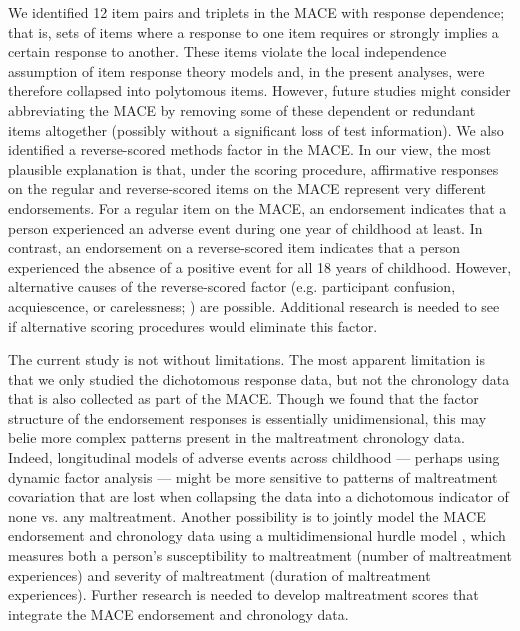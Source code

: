 \documentclass[letterpaper,man,natbib,noextraspace,floatsintext,longtable,12pt]{apa6}
\begin{document}
We identified 12 item pairs and triplets in the MACE with response dependence; that is, sets of items where a response to one item requires or strongly implies a certain response to another. These items violate the local independence assumption of item response theory models and, in the present analyses, were therefore collapsed into polytomous items. However, future studies might consider abbreviating the MACE by removing some of these dependent or redundant items altogether (possibly without a significant loss of test information). We also identified a reverse-scored methods factor in the MACE. In our view, the most plausible explanation is that, under the \cite{teicher2015maltreatment} scoring procedure, affirmative responses on the regular and reverse-scored items on the MACE represent very different endorsements. For a regular item on the MACE, an endorsement indicates that a person experienced an adverse event during one year of childhood at least. In contrast, an endorsement on a reverse-scored item indicates that a person experienced the absence of a positive event for all 18 years of childhood. However, alternative causes of the reverse-scored factor (e.g. participant confusion, acquiescence, or carelessness; \citealt{weijters2013reversed}) are possible. Additional research is needed to see if alternative scoring procedures would eliminate this factor. 

The current study is not without limitations. The most apparent limitation is that we only studied the dichotomous response data, but not the chronology data that is also collected as part of the MACE. Though we found that the factor structure of the endorsement responses is essentially unidimensional, this may belie more complex patterns present in the maltreatment chronology data. Indeed, longitudinal models of adverse events across childhood --- perhaps using dynamic factor analysis \citep{zhang2007bayesian} --- might be more sensitive to patterns of maltreatment covariation that are lost when collapsing the data into a dichotomous indicator of none vs. any maltreatment. Another possibility is to jointly model the MACE endorsement and chronology data using a multidimensional hurdle model \citep{magnus2021symptom}, which measures both a person's susceptibility to maltreatment (number of maltreatment experiences) and severity of maltreatment (duration of maltreatment experiences). Further research is needed to develop maltreatment scores that integrate the MACE endorsement and chronology data. 
\end{document}
